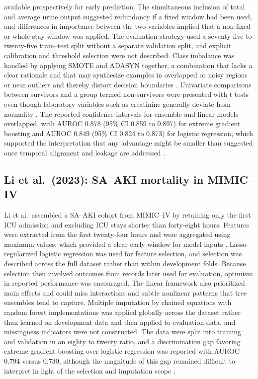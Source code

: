 available prospectively for early prediction. The simultaneous inclusion of total and average urine output suggested redundancy if a fixed window had been used, and differences in importance between the two variables implied that a non-fixed or whole-stay window was applied. The evaluation strategy used a seventy-five to twenty-five train–test split without a separate validation split, and explicit calibration and threshold selection were not described. Class imbalance was handled by applying SMOTE and ADASYN together, a combination that lacks a clear rationale and that may synthesize examples in overlapped or noisy regions or near outliers and thereby distort decision boundaries \citep{Chawla_2002,He_2008,Blagus_2013,Saez_2015,Krawczyk_2016}. Univariate comparisons between survivors and a group termed non-survivors were presented with t tests even though laboratory variables such as creatinine generally deviate from normality \citep{Haeckel_2010}. The reported confidence intervals for ensemble and linear models overlapped, with AUROC 0.878 (95\% CI 0.859 to 0.897) for extreme gradient boosting and AUROC 0.849 (95\% CI 0.824 to 0.873) for logistic regression, which supported the interpretation that any advantage might be smaller than suggested once temporal alignment and leakage are addressed \citep{Chen_2025}.

\subsection{Li et al.\ (2023): SA--AKI mortality in MIMIC--IV}
Li et al.\ assembled a SA--AKI cohort from MIMIC--IV by retaining only the first ICU admission and excluding ICU stays shorter than forty-eight hours. Features were extracted from the first twenty-four hours and were aggregated using maximum values, which provided a clear early window for model inputs \citep{Li_2023_SciRep}. Lasso-regularized logistic regression was used for feature selection, and selection was described across the full dataset rather than within development folds. Because selection then involved outcomes from records later used for evaluation, optimism in reported performance was encouraged. The linear framework also prioritized main effects and could miss interactions and subtle nonlinear patterns that tree ensembles tend to capture. Multiple imputation by chained equations with random forest implementations was applied globally across the dataset rather than learned on development data and then applied to evaluation data, and missingness indicators were not constructed. The data were split into training and validation in an eighty to twenty ratio, and a discrimination gap favoring extreme gradient boosting over logistic regression was reported with AUROC 0.794 versus 0.730, although the magnitude of this gap remained difficult to interpret in light of the selection and imputation scope \citep{Li_2023_SciRep}.


